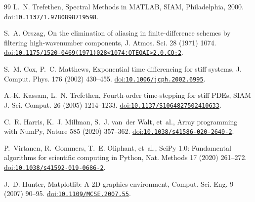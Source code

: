 \documentclass[preprint,12pt]{elsarticle}
\providecommand{\doi}[1]{\href{https://doi.org/#1}{doi:\nolinkurl{#1}}}
\begin{document}
\begin{thebibliography}{99}
L.~N. Trefethen, Spectral Methods in MATLAB, SIAM, Philadelphia, 2000.
\doi{10.1137/1.9780898719598}.

S.~A. Orszag, On the elimination of aliasing in finite-difference schemes by
filtering high-wavenumber components, J. Atmos. Sci. 28 (1971) 1074.
\href{https://doi.org/10.1175/1520-0469(1971)028\%3C1074:OTEOAI\%3E2.0.CO;2}{doi:\nolinkurl{10.1175/1520-0469(1971)028<1074:OTEOAI>2.0.CO;2}}.

S.~M. Cox, P.~C. Matthews, Exponential time differencing for stiff systems,
J. Comput. Phys. 176 (2002) 430--455. \doi{10.1006/jcph.2002.6995}.

A.-K. Kassam, L.~N. Trefethen, Fourth-order time-stepping for stiff PDEs,
SIAM J. Sci. Comput. 26 (2005) 1214--1233. \doi{10.1137/S1064827502410633}.

C.~R. Harris, K.~J. Millman, S.~J. van~der Walt, et~al., Array programming with
NumPy, Nature 585 (2020) 357--362. \doi{10.1038/s41586-020-2649-2}.

P.~Virtanen, R.~Gommers, T.~E. Oliphant, et~al., SciPy 1.0: Fundamental
algorithms for scientific computing in Python, Nat. Methods 17 (2020) 261--272.
\doi{10.1038/s41592-019-0686-2}.

J.~D. Hunter, Matplotlib: A 2D graphics environment, Comput. Sci. Eng. 9 (2007)
90--95. \doi{10.1109/MCSE.2007.55}.

\end{thebibliography}
\end{document}
